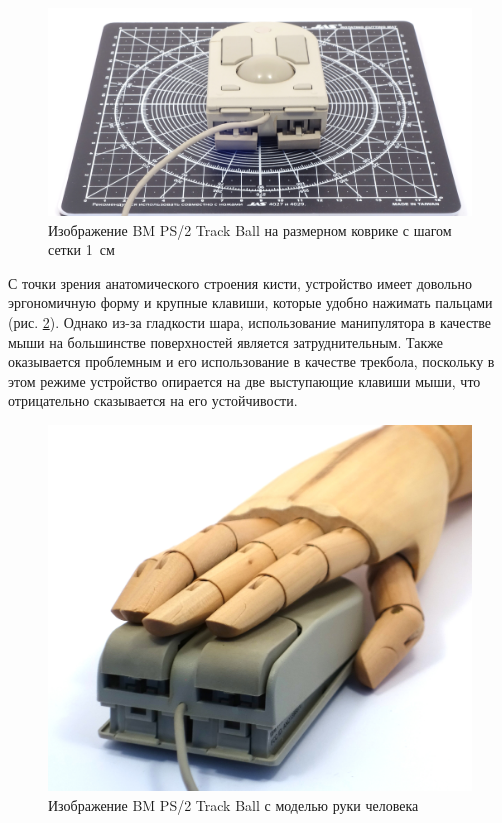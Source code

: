 \documentclass[11pt, a4paper]{article}
\begin{document}
\begin{figure}[h]
    \centering
    \includegraphics[scale=0.5]{1992_ibm_convertible/size_30.jpg}
    \caption{Изображение BM PS/2 Track Ball на размерном коврике с шагом сетки 1~см}
    \label{fig:IBMConvertibleSize}
\end{figure}

С точки зрения анатомического строения кисти, устройство имеет довольно эргономичную  форму и крупные клавиши, которые удобно нажимать пальцами (рис. \ref{fig:IBMConvertibleHand}). Однако из-за гладкости шара, использование манипулятора в качестве мыши на большинстве поверхностей является  затруднительным. Также оказывается проблемным и его использование в качестве трекбола, поскольку в этом режиме устройство опирается на две выступающие клавиши мыши, что отрицательно сказывается на его устойчивости.

\begin{figure}[h]
    \centering
    \includegraphics[scale=0.45]{1992_ibm_convertible/hand_60.jpg}
    \caption{Изображение BM PS/2 Track Ball с моделью руки человека}
    \label{fig:IBMConvertibleHand}
\end{figure}
\end{document}

